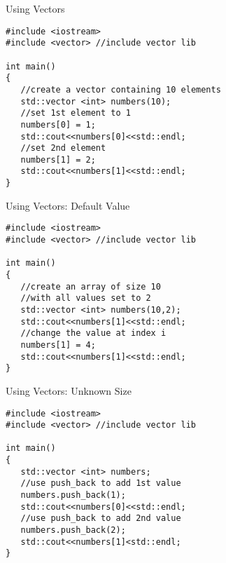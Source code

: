 \documentclass[xcolor={dvipsnames}]{beamer}
\begin{document}
\begin{frame}[fragile]{Using Vectors}
\begin{verbatim}
#include <iostream>
#include <vector> //include vector lib

int main()
{
   //create a vector containing 10 elements
   std::vector <int> numbers(10);
   //set 1st element to 1
   numbers[0] = 1;
   std::cout<<numbers[0]<<std::endl;
   //set 2nd element
   numbers[1] = 2;
   std::cout<<numbers[1]<<std::endl;
}
\end{verbatim}
\end{frame}

\begin{frame}[fragile]{Using Vectors: Default Value}
\begin{verbatim}
#include <iostream>
#include <vector> //include vector lib

int main()
{
   //create an array of size 10 
   //with all values set to 2
   std::vector <int> numbers(10,2);
   std::cout<<numbers[1]<<std::endl;
   //change the value at index i
   numbers[1] = 4;
   std::cout<<numbers[1]<<std::endl;
}
\end{verbatim}
\end{frame}
\begin{frame}[fragile]{Using Vectors: Unknown Size}
\begin{verbatim}
#include <iostream>
#include <vector> //include vector lib

int main()
{
   std::vector <int> numbers;
   //use push_back to add 1st value
   numbers.push_back(1);
   std::cout<<numbers[0]<<std::endl;
   //use push_back to add 2nd value
   numbers.push_back(2);
   std::cout<<numbers[1]<std::endl;
}
\end{verbatim}
\end{frame}
\end{document}
